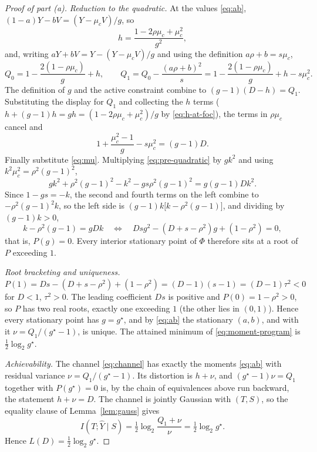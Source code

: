 \documentclass[11pt,onecolumn]{IEEEtran}
\newcommand{\hY}{\widehat{Y}}
\begin{document}
\begin{proof}[Proof of part (a)]
\emph{Reduction to the quadratic.} At the values \eqref{eq:ab},
$(1-a)Y-bV=(Y-\mu_cV)/g$, so
\begin{equation}
h=\frac{1-2\rho\mu_c+\mu_c^2}{g^2},
\label{eq:h-at-foc}
\end{equation}
and, writing $aY+bV=Y-(Y-\mu_cV)/g$ and using the definition
$a\rho+b=s\mu_c$,
\[
Q_0=1-\frac{2(1-\rho\mu_c)}{g}+h,
\qquad
Q_1=Q_0-\frac{(a\rho+b)^2}{s}
=1-\frac{2(1-\rho\mu_c)}{g}+h-s\mu_c^2 .
\]
The definition of $g$ and the active constraint combine to
$(g-1)(D-h)=Q_1$. Substituting the display for $Q_1$ and collecting
the $h$ terms ($h+(g-1)h=gh=(1-2\rho\mu_c+\mu_c^2)/g$ by
\eqref{eq:h-at-foc}), the terms in $\rho\mu_c$ cancel and
\begin{equation}
1+\frac{\mu_c^2-1}{g}-s\mu_c^2=(g-1)D .
\label{eq:pre-quadratic}
\end{equation}
Finally substitute \eqref{eq:mu}. Multiplying
\eqref{eq:pre-quadratic} by $gk^2$ and using
$k^2\mu_c^2=\rho^2(g-1)^2$,
\[
gk^2+\rho^2(g-1)^2-k^2-gs\rho^2(g-1)^2=g(g-1)Dk^2 .
\]
Since $1-gs=-k$, the second and fourth terms on the left combine to
$-\rho^2(g-1)^2k$, so the left side is
$(g-1)k\bigl[k-\rho^2(g-1)\bigr]$, and dividing by $(g-1)k>0$,
\[
k-\rho^2(g-1)=gDk
\quad\Longleftrightarrow\quad
Dsg^2-(D+s-\rho^2)g+(1-\rho^2)=0,
\]
that is, $P(g)=0$. Every interior stationary point of $\Phi$ therefore
sits at a root of $P$ exceeding $1$.

\emph{Root bracketing and uniqueness.}
$P(1)=Ds-(D+s-\rho^2)+(1-\rho^2)=(D-1)(s-1)=(D-1)\tau^2<0$ for $D<1$,
$\tau^2>0$. The leading coefficient $Ds$ is positive and
$P(0)=1-\rho^2>0$, so $P$ has two real roots, exactly one exceeding
$1$ (the other lies in $(0,1)$). Hence every stationary point has
$g=g^\star$, and by \eqref{eq:ab} the stationary $(a,b)$, and with it
$\nu=Q_1/(g^\star-1)$, is unique. The attained minimum of
\eqref{eq:moment-program} is $\tfrac12\log_2 g^\star$.

\emph{Achievability.} The channel \eqref{eq:channel} has exactly the
moments \eqref{eq:ab} with residual variance $\nu=Q_1/(g^\star-1)$. Its
distortion is $h+\nu$, and $(g^\star-1)\nu=Q_1$ together with
$P(g^\star)=0$ is, by the chain of equivalences above run backward,
the statement $h+\nu=D$. The channel is jointly Gaussian with $(T,S)$,
so the equality clause of Lemma~\ref{lem:gauss} gives
\[
I(T;\hY\mid S)=\tfrac12\log_2\frac{Q_1+\nu}{\nu}=\tfrac12\log_2 g^\star .
\]
Hence $L(D)=\tfrac12\log_2 g^\star$.
\end{proof}
\end{document}
